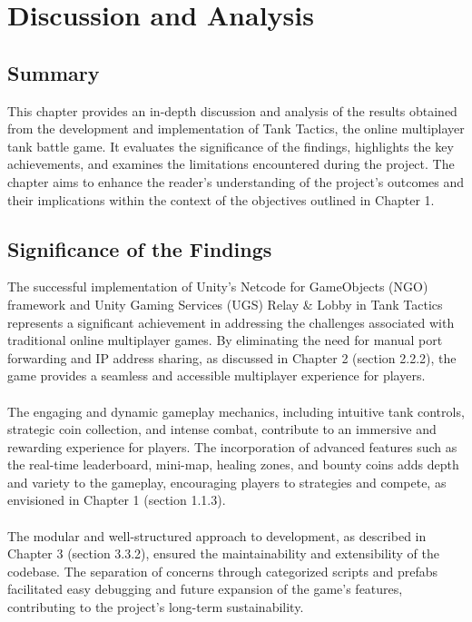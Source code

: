 \chapter{Discussion and Analysis}
\label{ch:evaluation}


\section{Summary}
This chapter provides an in-depth discussion and analysis of the results obtained from the development and implementation of Tank Tactics, the online multiplayer tank battle game. It evaluates the significance of the findings, highlights the key achievements, and examines the limitations encountered during the project. The chapter aims to enhance the reader's understanding of the project's outcomes and their implications within the context of the objectives outlined in Chapter 1.

\section{Significance of the Findings}
The successful implementation of Unity's Netcode for GameObjects (NGO) framework and Unity Gaming Services (UGS) Relay \& Lobby in Tank Tactics represents a significant achievement in addressing the challenges associated with traditional online multiplayer games. By eliminating the need for manual port forwarding and IP address sharing, as discussed in Chapter 2 (section 2.2.2), the game provides a seamless and accessible multiplayer experience for players.
\\
\noindent
\\
The engaging and dynamic gameplay mechanics, including intuitive tank controls, strategic coin collection, and intense combat, contribute to an immersive and rewarding experience for players. The incorporation of advanced features such as the real-time leaderboard, mini-map, healing zones, and bounty coins adds depth and variety to the gameplay, encouraging players to strategies and compete, as envisioned in Chapter 1 (section 1.1.3).
\\
\noindent
\\
The modular and well-structured approach to development, as described in Chapter 3 (section 3.3.2), ensured the maintainability and extensibility of the codebase. The separation of concerns through categorized scripts and prefabs facilitated easy debugging and future expansion of the game's features, contributing to the project's long-term sustainability.


